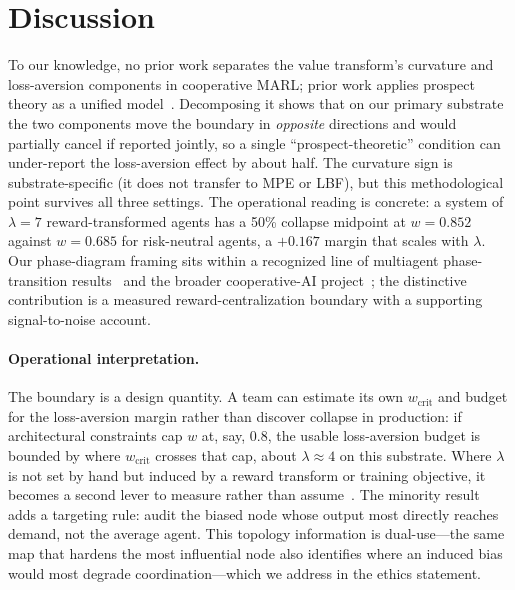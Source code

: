 \documentclass[letterpaper]{article} %
\theoremstyle{plain}
\newcommand{\wcrit}{w_{\mathrm{crit}}}
\begin{document}
\section{Discussion}
\label{sec:discussion}

To our knowledge, no prior work separates the value transform's curvature and loss-aversion
components in cooperative MARL; prior work applies prospect theory as a unified
model~\citep{lalmohammed2025,ghaemi2024risk}. Decomposing it shows that on our primary substrate the
two components move the boundary in \emph{opposite} directions and would partially cancel if reported
jointly, so a single ``prospect-theoretic'' condition can under-report the loss-aversion effect by
about half. The curvature sign is substrate-specific (it does not transfer to MPE or LBF), but this
methodological point survives all three settings. The operational reading is concrete: a system of
$\lambda{=}7$ reward-transformed agents has a 50\% collapse midpoint at $w=0.852$ against $w=0.685$
for risk-neutral agents, a $+0.167$ margin that scales with $\lambda$. Our phase-diagram framing
sits within a recognized line of multiagent phase-transition
results~\citep{yamaguchi2025,capannoli2026phase} and the broader cooperative-AI
project~\citep{dafoe2020open,hammond2025multiagent,barfuss2020caring}; the distinctive
contribution is a measured reward-centralization boundary with a supporting signal-to-noise
account.

\paragraph{Operational interpretation.}
The boundary is a design quantity. A team can estimate its own $\wcrit$ and budget for the
loss-aversion margin rather than discover collapse in production: if architectural constraints cap
$w$ at, say, $0.8$, the usable loss-aversion budget is bounded by where $\wcrit$ crosses that cap,
about $\lambda\approx4$ on this substrate. Where $\lambda$ is not set by hand but induced by a reward
transform or training objective, it becomes a second lever to measure rather than
assume~\citep{ethayarajh2024kto,rabin2000risk}. The minority result adds a targeting rule: audit the
biased node whose output most directly reaches demand, not the average agent. This topology
information is dual-use---the same map that hardens the most influential node also identifies where
an induced bias would most degrade coordination---which we address in the ethics statement.
\end{document}
